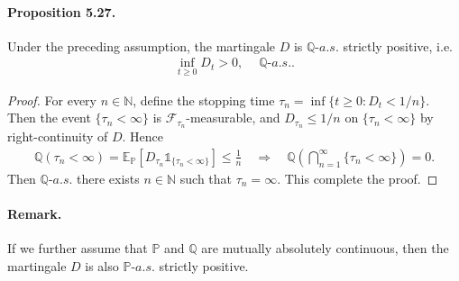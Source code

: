 \documentclass{article}
\numberwithin{equation}{section}
\newcommand{\E}{\mathbb{E}}
\newcommand{\bbP}{\mathbb{P}}
\newcommand{\bbQ}{\mathbb{Q}}
\theoremstyle{plain}
\theoremstyle{definition}
\begin{document}
\paragraph{Proposition 5.27.\label{prop:5.27}} Under the preceding assumption, the martingale $D$ is $\bbQ$-$a.s.$ strictly positive, i.e.
\begin{align*}
	\inf_{t\geq 0}D_t >0,\quad\ \bbQ\textit{-}a.s..
\end{align*}
\begin{proof}
For every $n\in\mathbb{N}$, define the stopping time $\tau_n=\inf\{t\geq 0:D_t<1/n\}$. Then the event $\{\tau_n<\infty\}$ is $\mathscr{F}_{\tau_n}$-measurable, and $D_{\tau_n}\leq 1/n$ on $\{\tau_n<\infty\}$ by right-continuity of $D$. Hence
\begin{align*}
	\bbQ(\tau_n<\infty)=\E_\bbP\left[D_{\tau_n}\mathds{1}_{\{\tau_n<\infty\}}\right]\leq\frac{1}{n}\quad\Rightarrow\quad\bbQ\left(\bigcap_{n=1}^\infty\{\tau_n<\infty\}\right)=0.
\end{align*}
Then $\mathbb{Q}$-$a.s.$ there exists $n\in\mathbb{N}$ such that $\tau_n=\infty$. This complete the proof.
\end{proof}
\paragraph{Remark.} If we further assume that $\bbP$ and $\bbQ$ are mutually absolutely continuous, then the martingale $D$ is also $\bbP$-$a.s.$ strictly positive.
\end{document}
